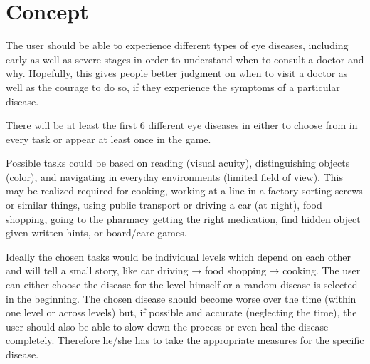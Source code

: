 \documentclass{acm_proc_article-sp}
\begin{document}
\section{Concept}

The user should be able to experience different types of eye diseases,
including early as well as severe stages in order to understand when to consult
a doctor and why. Hopefully, this gives people better judgment on when to
visit a doctor as well as the courage to do so, if they experience the symptoms
of a particular disease.

There will be at least the first 6 different eye diseases in
 either to choose from in every task or appear at least
once in the game.

Possible tasks could be based on reading (visual acuity), distinguishing
objects (color), and navigating in everyday environments
(limited field of view).
This may be realized required for cooking, working at a line in a factory
sorting screws or similar things, using public transport or driving a car
(at night), food shopping, going to the pharmacy getting the right medication,
find hidden object given written hints, or board/care games.

Ideally the chosen tasks would be individual levels which depend on each other
and will tell a small story, like car driving → food shopping → cooking.
The user can either choose the disease for the level himself or a random disease
is selected in the beginning.
The chosen disease should become worse over the time (within one level or
across levels) but, if possible and accurate (neglecting the time), the user
should also be able to slow down the process or even heal the disease
completely. Therefore he/she has to take the appropriate measures for the
specific disease.
\end{document}
